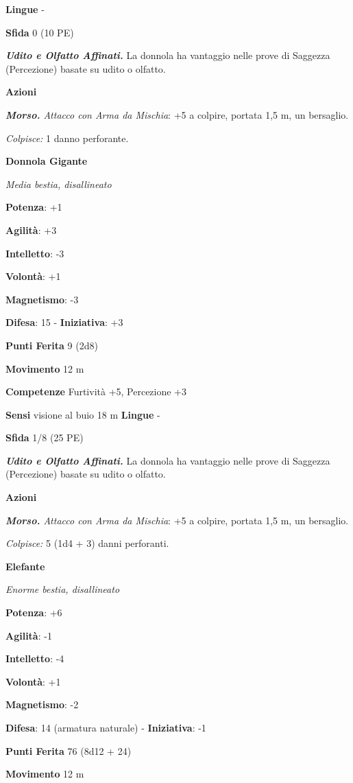 \begin{multicols}{2}
\textbf{Lingue} -

\textbf{Sfida} 0 (10 PE)

\emph{\textbf{Udito e Olfatto Affinati.}} La donnola ha vantaggio nelle
prove di Saggezza (Percezione) basate su udito o olfatto.

\textbf{Azioni}

\emph{\textbf{Morso.} Attacco con Arma da Mischia}: +5 a colpire,
portata 1,5 m, un bersaglio.

\emph{Colpisce:} 1 danno perforante.

\textbf{Donnola Gigante}

\emph{Media bestia, disallineato}

\textbf{Potenza}: +1

\textbf{Agilità}: +3

\textbf{Intelletto}: -3

\textbf{Volontà}: +1

\textbf{Magnetismo}: -3

\textbf{Difesa}: 15 - \textbf{Iniziativa}: +3

\textbf{Punti Ferita} 9 (2d8)

\textbf{Movimento} 12 m

\textbf{Competenze} Furtività +5, Percezione +3

\textbf{Sensi} visione al buio 18 m
\textbf{Lingue} -

\textbf{Sfida} 1/8 (25 PE)

\emph{\textbf{Udito e Olfatto Affinati.}} La donnola ha vantaggio nelle
prove di Saggezza (Percezione) basate su udito o olfatto.

\textbf{Azioni}

\emph{\textbf{Morso.} Attacco con Arma da Mischia}: +5 a colpire,
portata 1,5 m, un bersaglio.

\emph{Colpisce:} 5 (1d4 + 3) danni perforanti.

\textbf{Elefante}

\emph{Enorme bestia, disallineato}

\textbf{Potenza}: +6

\textbf{Agilità}: -1

\textbf{Intelletto}: -4

\textbf{Volontà}: +1

\textbf{Magnetismo}: -2

\textbf{Difesa}: 14 (armatura naturale) - \textbf{Iniziativa}: -1

\textbf{Punti Ferita} 76 (8d12 + 24)

\textbf{Movimento} 12 m


\end{multicols}
